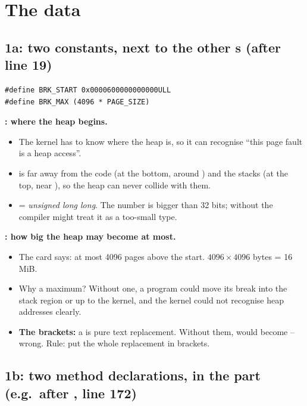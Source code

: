 \documentclass[11pt]{report}
\newcommand{\why}[1]{\par\smallskip\noindent\textbf{#1}\par\nopagebreak}
\begin{document}
\section{The data \hfill {\normalsize{}}}

\subsection*{1a: two constants, next to the other s (after line 19)}

\begin{lstlisting}[style=cpp]
#define BRK_START 0x0000600000000000ULL
#define BRK_MAX (4096 * PAGE_SIZE)
\end{lstlisting}

\why{: where the heap begins.}
\begin{itemize}
  \item The kernel has to know where the heap is, so it can recognise ``this page fault is a heap access''.
  \item {} is far away from the code (at the bottom, around ) and the
        stacks (at the top, near ), so the heap can never collide with them.
  \item {} = \emph{unsigned long long}. The number is bigger than 32 bits; without  the
        compiler might treat it as a too-small type.
\end{itemize}

\why{: how big the heap may become at most.}
\begin{itemize}
  \item The card says: at most 4096 pages above the start. $4096 \times 4096$ bytes = 16 MiB.
  \item Why a maximum? Without one, a program could move its break into the stack region or up to the
        kernel, and the kernel could not recognise heap addresses clearly.
  \item \textbf{The brackets:} a  is pure text replacement. Without them, 
        would become  -- wrong. Rule: put the whole replacement in brackets.
\end{itemize}

\subsection*{1b: two method declarations, in the  part (e.g.\ after , line 172)}
\end{document}

